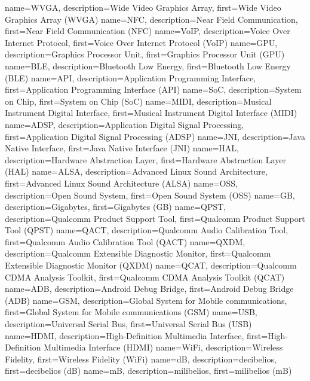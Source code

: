 {
  name={WVGA},
  description={Wide Video Graphics Array},
  first={Wide Video Graphics Array (WVGA)}
}
{
	name={NFC},
	description={Near Field Communication},
	first={Near Field Communication (NFC)}
}
{
	name={VoIP},
	description={Voice Over Internet Protocol},
	first={Voice Over Internet Protocol (VoIP)}
}
{
	name={GPU},
	description={Graphics Processor Unit},
	first={Graphics Processor Unit (GPU)}
}
{
	name={BLE},
	description={Bluetooth Low Energy},
	first={Bluetooth Low Energy (BLE)}
}
{
	name={API},
	description={Application Programming Interface},
	first={Application Programming Interface (API)}
}
{
	name={SoC},
	description={System on Chip},
	first={System on Chip (SoC)}
}
{
	name={MIDI},
	description={Musical Instrument Digital Interface},
	first={Musical Instrument Digital Interface (MIDI)}
}
{
	name={ADSP},
	description={Application Digital Signal Processing},
	first={Application Digital Signal Processing (ADSP)}
}
{
	name={JNI},
	description={Java Native Interface},
	first={Java Native Interface (JNI)}
}
{
	name={HAL},
	description={Hardware Abstraction Layer},
	first={Hardware Abstraction Layer (HAL)}
}
{
	name={ALSA},
	description={Advanced Linux Sound Architecture},
	first={Advanced Linux Sound Architecture (ALSA)}
}
{
	name={OSS},
	description={Open Sound System},
	first={Open Sound System (OSS)}
}
{
	name={GB},
	description={Gigabytes},
	first={Gigabytes (GB)}
}
{
	name={QPST},
	description={Qualcomm Product Support Tool},
	first={Qualcomm Product Support Tool (QPST)}
}
{
	name={QACT},
	description={Qualcomm Audio Calibration Tool},
	first={Qualcomm Audio Calibration Tool (QACT)}
}
{
	name={QXDM},
	description={Qualcomm Extensible Diagnostic Monitor},
	first={Qualcomm Extensible Diagnostic Monitor (QXDM)}
}
{
	name={QCAT},
	description={Qualcomm CDMA Analysis Toolkit},
	first={Qualcomm CDMA Analysis Toolkit (QCAT)}
}
{
	name={ADB},
	description={Android Debug Bridge},
	first={Android Debug Bridge (ADB)}
}
{	
	name={GSM},
	description={Global System for Mobile communications},
	first={Global System for Mobile communications (GSM)}
}
{	
	name={USB},
	description={Universal Serial Bus},
	first={Universal Serial Bus (USB)}
}
{	
	name={HDMI},
	description={High-Definition Multimedia Interface},
	first={High-Definition Multimedia Interface (HDMI)}
}
{	
	name={WiFi},
	description={Wireless Fidelity},
	first={Wireless Fidelity (WiFi)}
}
{
	name={dB},
	description={decibelios},
	first={decibelios (dB)}
}
{
	name={mB},
	description={milibelios},
	first={milibelios (mB)}
}